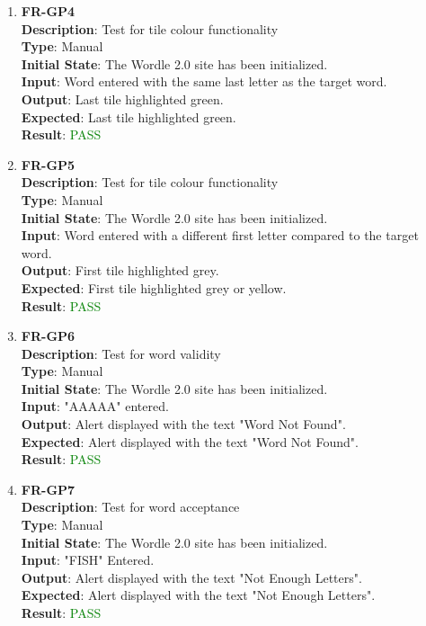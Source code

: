 \documentclass[12pt, titlepage]{article}
\begin{document}
\begin{enumerate}
	\item \textbf{FR-GP4\\}
	\textbf{Description}: Test for tile colour functionality\\
	\textbf{Type}: Manual\\
	\textbf{Initial State}: The Wordle 2.0 site has been initialized.\\
	\textbf{Input}: Word entered with the same last letter as the target word.\\
	\textbf{Output}: Last tile highlighted green. \\
	\textbf{Expected}: Last tile highlighted green.\\
	\textbf{Result}: \textcolor{green}{PASS}\\
	
	\item \textbf{FR-GP5\\}
	\textbf{Description}: Test for tile colour functionality\\
	\textbf{Type}: Manual\\
	\textbf{Initial State}: The Wordle 2.0 site has been initialized.\\
	\textbf{Input}: Word entered with a different first letter  compared to the target word.\\
	\textbf{Output}: First tile highlighted grey. \\
	\textbf{Expected}: First tile highlighted grey or yellow.\\
	\textbf{Result}: \textcolor{green}{PASS}\\
	
		
	\item \textbf{FR-GP6\\}
	\textbf{Description}: Test for word validity\\
	\textbf{Type}: Manual\\
	\textbf{Initial State}: The Wordle 2.0 site has been initialized.\\
	\textbf{Input}: "AAAAA" entered.\\
	\textbf{Output}: Alert displayed with the text "Word Not Found". \\
	\textbf{Expected}: Alert displayed with the text "Word Not Found".\\
	\textbf{Result}: \textcolor{green}{PASS}\\
	
		
	\item \textbf{FR-GP7\\}
	\textbf{Description}: Test for word acceptance\\
	\textbf{Type}: Manual\\
	\textbf{Initial State}: The Wordle 2.0 site has been initialized.\\
	\textbf{Input}: "FISH" Entered.\\
	\textbf{Output}: Alert displayed with the text "Not Enough Letters". \\
	\textbf{Expected}: Alert displayed with the text "Not Enough Letters".\\
	\textbf{Result}: \textcolor{green}{PASS}\\
	

\end{enumerate}
\end{document}
